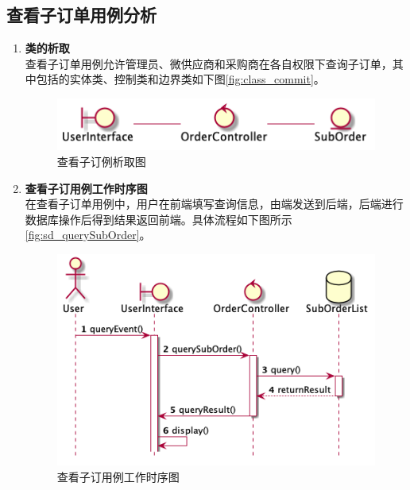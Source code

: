 	\subsection{查看子订单用例分析} %
	\label{sub:查看子订单用例分析}
	\begin{enumerate}
		\item \textbf{类的析取} \\
		查看子订单用例允许管理员、微供应商和采购商在各自权限下查询子订单，其中包括的实体类、控制类和边界类如下图\autoref{fig:class_commit}。
		\begin{figure}[htp]
		    \centering
		    \includegraphics[width=12cm]{report/figure/classAnalyse/querySubOrder.png}
		    \caption{查看子订例析取图}
		    \label{fig:class_commit}
		\end{figure}

		\item \textbf{查看子订用例工作时序图} \\
		在查看子订单用例中，用户在前端填写查询信息，由端发送到后端，后端进行数据库操作后得到结果返回前端。具体流程如下图所示\autoref{fig:sd_querySubOrder}。

		\begin{figure}[htp]
		    \centering
		    \includegraphics[width=12cm]{report/figure/sequenceDiagram/sd_querySubOrder.png}
		    \caption{查看子订用例工作时序图}
		    \label{fig:sd_querySubOrder}
		\end{figure}
	\end{enumerate}
	
